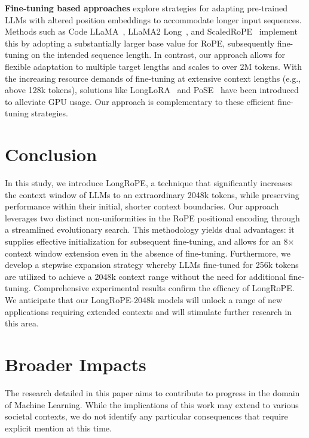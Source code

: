 \textbf{Fine-tuning based approaches} explore strategies for adapting pre-trained LLMs with altered position embeddings to accommodate longer input sequences. Methods such as Code LLaMA~\cite{codellama}, LLaMA2 Long~\cite{xiong2023effective}, and ScaledRoPE~\cite{liu2023scaling} implement this by adopting a substantially larger base value for RoPE, subsequently fine-tuning on the intended sequence length. In contrast, our approach allows for flexible adaptation to multiple target lengths and scales to over 2M tokens. With the increasing resource demands of fine-tuning at extensive context lengths (e.g., above 128k tokens), solutions like LongLoRA~\cite{longlora} and PoSE~\cite{zhu2023pose} have been introduced to alleviate GPU usage. Our approach is complementary to these efficient fine-tuning strategies.

\section{Conclusion}

In this study, we introduce LongRoPE, a technique that significantly increases the context window of LLMs to an extraordinary 2048k tokens, while preserving performance within their initial, shorter context boundaries. Our approach leverages two distinct non-uniformities in the RoPE positional encoding through a streamlined evolutionary search. This methodology yields dual advantages: it supplies effective initialization for subsequent fine-tuning, and allows for an 8$\times$ context window extension even in the absence of fine-tuning. Furthermore, we develop a stepwise expansion strategy whereby LLMs fine-tuned for 256k tokens are utilized to achieve a 2048k context range without the need for additional fine-tuning. Comprehensive experimental results confirm the efficacy of LongRoPE. We anticipate that our LongRoPE-2048k models will unlock a range of new applications requiring extended contexts and will stimulate further research in this area.

\section*{Broader Impacts} The research detailed in this paper aims to contribute to progress in the domain of Machine Learning. While the implications of this work may extend to various societal contexts, we do not identify any particular consequences that require explicit mention at this time.

	\balance

